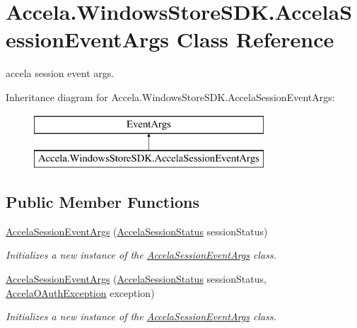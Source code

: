 \hypertarget{class_accela_1_1_windows_store_s_d_k_1_1_accela_session_event_args}{\section{Accela.\+Windows\+Store\+S\+D\+K.\+Accela\+Session\+Event\+Args Class Reference}
\label{class_accela_1_1_windows_store_s_d_k_1_1_accela_session_event_args}
}


accela session event args.  


Inheritance diagram for Accela.\+Windows\+Store\+S\+D\+K.\+Accela\+Session\+Event\+Args\+:\begin{figure}[H]
\begin{center}
\leavevmode
\includegraphics[height=2.000000cm]{class_accela_1_1_windows_store_s_d_k_1_1_accela_session_event_args}
\end{center}
\end{figure}
\subsection*{Public Member Functions}
\begin{DoxyCompactItemize}
\item 
\hyperlink{class_accela_1_1_windows_store_s_d_k_1_1_accela_session_event_args_a1ea2a501082a022bc9a80cb0a031e84e}{Accela\+Session\+Event\+Args} (\hyperlink{namespace_accela_1_1_windows_store_s_d_k_a20db67946f939b9dc665320aff52e802}{Accela\+Session\+Status} session\+Status)
\begin{DoxyCompactList}\small\item\em Initializes a new instance of the \hyperlink{class_accela_1_1_windows_store_s_d_k_1_1_accela_session_event_args}{Accela\+Session\+Event\+Args} class. \end{DoxyCompactList}\item 
\hyperlink{class_accela_1_1_windows_store_s_d_k_1_1_accela_session_event_args_a5187e4d12db0d21a45711e13c2a03637}{Accela\+Session\+Event\+Args} (\hyperlink{namespace_accela_1_1_windows_store_s_d_k_a20db67946f939b9dc665320aff52e802}{Accela\+Session\+Status} session\+Status, \hyperlink{class_accela_1_1_windows_store_s_d_k_1_1_accela_o_auth_exception}{Accela\+O\+Auth\+Exception} exception)
\begin{DoxyCompactList}\small\item\em Initializes a new instance of the \hyperlink{class_accela_1_1_windows_store_s_d_k_1_1_accela_session_event_args}{Accela\+Session\+Event\+Args} class. \end{DoxyCompactList}\end{DoxyCompactItemize}
